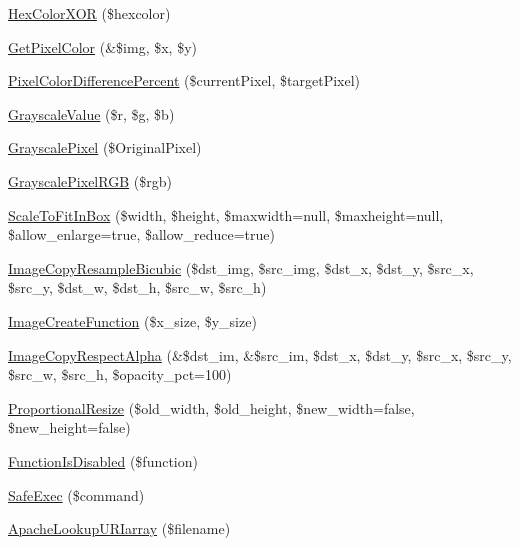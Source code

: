\begin{DoxyCompactItemize}
\item 
\hyperlink{classphpthumb__functions_aead056424cb4681dbe161bce8683da3b}{\-Hex\-Color\-X\-O\-R} (\$hexcolor)
\item 
\hyperlink{classphpthumb__functions_ac73caf77553f599f9bdb88c03281b33b}{\-Get\-Pixel\-Color} (\&\$img, \$x, \$y)
\item 
\hyperlink{classphpthumb__functions_a21903a1bd6f92685f0c3188c9776801a}{\-Pixel\-Color\-Difference\-Percent} (\$current\-Pixel, \$target\-Pixel)
\item 
\hyperlink{classphpthumb__functions_af419a3a071e831a2c4de93b73f3e7063}{\-Grayscale\-Value} (\$r, \$g, \$b)
\item 
\hyperlink{classphpthumb__functions_a5f3d1f38c5a6c3a5b83a8f96042ffef5}{\-Grayscale\-Pixel} (\$\-Original\-Pixel)
\item 
\hyperlink{classphpthumb__functions_a64ab911b4f9a7bf2d8e103ab97c96a8b}{\-Grayscale\-Pixel\-R\-G\-B} (\$rgb)
\item 
\hyperlink{classphpthumb__functions_a1a6a1a11796857dd739cc463c348192b}{\-Scale\-To\-Fit\-In\-Box} (\$width, \$height, \$maxwidth=null, \$maxheight=null, \$allow\-\_\-enlarge=true, \$allow\-\_\-reduce=true)
\item 
\hyperlink{classphpthumb__functions_ab359dab758fa1fe794f7ee77bcc6fa57}{\-Image\-Copy\-Resample\-Bicubic} (\$dst\-\_\-img, \$src\-\_\-img, \$dst\-\_\-x, \$dst\-\_\-y, \$src\-\_\-x, \$src\-\_\-y, \$dst\-\_\-w, \$dst\-\_\-h, \$src\-\_\-w, \$src\-\_\-h)
\item 
\hyperlink{classphpthumb__functions_a02caac9e703a9c106e3fea3a6215130d}{\-Image\-Create\-Function} (\$x\-\_\-size, \$y\-\_\-size)
\item 
\hyperlink{classphpthumb__functions_a3b35e57dd6a7b582dc71d5da44468455}{\-Image\-Copy\-Respect\-Alpha} (\&\$dst\-\_\-im, \&\$src\-\_\-im, \$dst\-\_\-x, \$dst\-\_\-y, \$src\-\_\-x, \$src\-\_\-y, \$src\-\_\-w, \$src\-\_\-h, \$opacity\-\_\-pct=100)
\item 
\hyperlink{classphpthumb__functions_a0b7ce9a69725437b7b71c8c4279d497d}{\-Proportional\-Resize} (\$old\-\_\-width, \$old\-\_\-height, \$new\-\_\-width=false, \$new\-\_\-height=false)
\item 
\hyperlink{classphpthumb__functions_ab83588a52cc1a218c8183f03872e4a25}{\-Function\-Is\-Disabled} (\$function)
\item 
\hyperlink{classphpthumb__functions_a32ab9bd049bb6b7e0352329726a0ab51}{\-Safe\-Exec} (\$command)
\item 
\hyperlink{classphpthumb__functions_acb4fb35a3540b66f2543550e25197a74}{\-Apache\-Lookup\-U\-R\-Iarray} (\$filename)

\end{DoxyCompactItemize}
